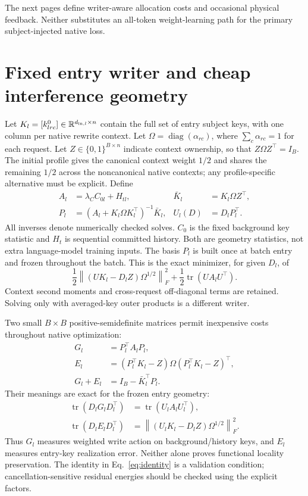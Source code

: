 \documentclass[10pt]{article}
\newcommand{\tr}{\operatorname{tr}}
\newcommand{\norm}[1]{\left\lVert#1\right\rVert}
\newcommand{\RR}{\mathbb R}
\begin{document}
The next pages define writer-aware allocation costs and occasional
physical feedback. Neither substitutes an all-token weight-learning path
for the primary subject-injected native loss.

\newpage
\section{Fixed entry writer and cheap interference geometry}
Let $K_l=[k^0_{lrc}]\in\RR^{d_{{\rm in},l}\times n}$ contain the full
set of entry subject keys, with one column per native rewrite context.
Let $\Omega=\operatorname{diag}(\alpha_{rc})$, where
$\sum_c\alpha_{rc}=1$ for each request. Let
$Z\in\{0,1\}^{B\times n}$ indicate context ownership, so that
$Z\Omega Z^\top=I_B$. The initial profile gives the canonical context
weight $1/2$ and shares the remaining $1/2$ across the noncanonical
native contexts; any profile-specific alternative must be explicit.
Define
\begin{align}
 A_l&=\lambda_C C_{0l}+H_{tl}, &
 \bar K_l&=K_l\Omega Z^\top,\\
 P_l&=(A_l+K_l\Omega K_l^\top)^{-1}\bar K_l,
 & U_l(D)&=D_lP_l^\top. \label{eq:writer}
\end{align}
All inverses denote numerically checked solves. $C_0$ is the fixed
background key statistic and $H_t$ is sequential committed history.
Both are geometry statistics, not extra language-model training inputs.
The basis $P_l$ is built once at batch entry and frozen throughout the
batch. This is the exact minimizer, for given $D_l$, of
\[
 \frac12\norm{(UK_l-D_lZ)\Omega^{1/2}}_F^2
 +\frac12\tr(UA_lU^\top).
\]
Context second moments and cross-request off-diagonal terms are retained.
Solving only with averaged-key outer products is a different writer.

Two small $B\times B$ positive-semidefinite matrices permit inexpensive
costs throughout native optimization:
\begin{align}
 G_l&=P_l^\top A_lP_l,\\
 E_l&=(P_l^\top K_l-Z)\Omega(P_l^\top K_l-Z)^\top,\\
 G_l+E_l&=I_B-\bar K_l^\top P_l. \label{eq:identity}
\end{align}
Their meanings are exact for the frozen entry geometry:
\begin{align}
 \tr(D_lG_lD_l^\top)&=\tr(U_lA_lU_l^\top),\\
 \tr(D_lE_lD_l^\top)&=
 \norm{(U_lK_l-D_lZ)\Omega^{1/2}}_F^2.
\end{align}
Thus $G_l$ measures weighted write action on background/history keys,
and $E_l$ measures entry-key realization error. Neither alone proves
functional locality preservation. The identity in Eq.~\eqref{eq:identity}
is a validation condition; cancellation-sensitive residual energies
should be checked using the explicit factors.
\end{document}
